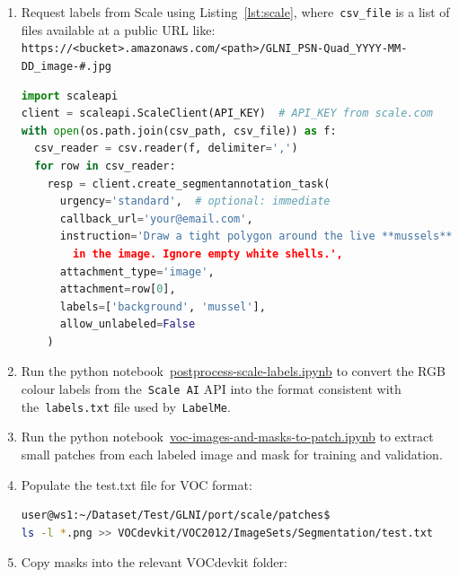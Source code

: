 \documentclass[11pt]{article} %
\begin{document}
\begin{enumerate}

\item Request labels from Scale using Listing~\ref{lst:scale}, 
where~\texttt{csv\_file} is a list of files available at a public URL 
like:\\
\texttt{https://<bucket>.amazonaws.com/<path>/GLNI\_PSN-Quad\_YYYY-MM-DD\_image-\#.jpg}

\begin{lstlisting}[language=python, caption=A complete Python snippet for 
requesting semantic segmentation labels from the Scale annotation service
for an arbitrary number of images specified in~\texttt{csv\_file}., 
frame=single, label={lst:scale}]
import scaleapi
client = scaleapi.ScaleClient(API_KEY)  # API_KEY from scale.com
with open(os.path.join(csv_path, csv_file)) as f:
  csv_reader = csv.reader(f, delimiter=',')
  for row in csv_reader:
    resp = client.create_segmentannotation_task(
      urgency='standard',  # optional: immediate
      callback_url='your@email.com',
      instruction='Draw a tight polygon around the live **mussels**
        in the image. Ignore empty white shells.',
      attachment_type='image',
      attachment=row[0],
      labels=['background', 'mussel'],
      allow_unlabeled=False
    )
\end{lstlisting}    

\item Run the python
notebook~\href{https://github.com/AngusG/cciw-zebra-mussel/blob/master/labelme/scale}{postprocess-scale-labels.ipynb}
to convert the RGB colour labels from the~\texttt{Scale AI} API into the format
consistent with the~\texttt{labels.txt} file used by~\texttt{LabelMe}.

\item Run the python
notebook~\href{https://github.com/AngusG/cciw-zebra-mussel/blob/master/labelme/voc-images-and-masks-to-patch.ipynb}{voc-images-and-masks-to-patch.ipynb}
to extract small patches from each labeled image and mask for training and
validation.

\item Populate the test.txt file for VOC format:

\begin{lstlisting}[language=bash, frame=single]
user@ws1:~/Dataset/Test/GLNI/port/scale/patches$ 
ls -l *.png >> VOCdevkit/VOC2012/ImageSets/Segmentation/test.txt
\end{lstlisting}

\item Copy masks into the relevant VOCdevkit folder:


\end{enumerate}
\end{document}

